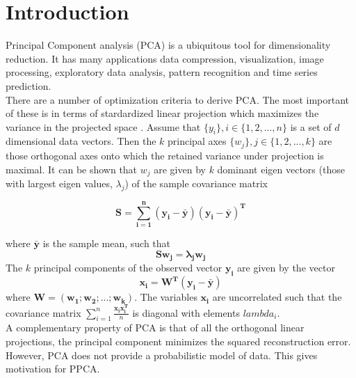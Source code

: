 \chapter{Introduction}

Principal Component analysis (PCA) is a ubiquitous tool for dimensionality reduction.  It has many applications data compression, visualization, image processing, exploratory data analysis, pattern recognition and time series prediction. \\
There are a number of optimization criteria to derive PCA. The most important of these is in terms of stardardized linear projection which maximizes the variance in the projected space \cite{PCA}. Assume that $\{y_i\}, i \in \{1, 2, ..., n\}$ is a set of $d$ dimensional data vectors. Then the $k$ principal axes $\{w_j\}, j \in \{1, 2, ..., k\}$ are those orthogonal axes onto which the retained variance under projection is maximal. It can be shown that $w_j$ are given by $k$ dominant eigen vectors (those with largest eigen values, $\lambda_j$) of the sample covariance matrix  
\begin{center}
\begin{equation}
	\mathbf{S = \sum_{i=1}^n (y_i - \bar{y})(y_i - \bar{y})^T}
\end{equation}
\end{center}
where $\mathbf{\bar{y}}$ is the sample mean, such that
\begin{equation}
\mathbf{Sw_j=\lambda_jw_j}
\end{equation}
The $k$ principal components of the observed vector $\mathbf{y_i}$ are given by the vector 
\begin{equation}
\mathbf{x_i=W^T(y_i - \bar{y})}
\end{equation}
where $\mathbf{W = (w_1;w_2;...;w_k)}$. The variables $\mathbf{x_i}$ are uncorrelated such that the covariance matrix $\sum_{i=1}^n\frac{\mathbf{x_ix_i^T}}{n}$ is diagonal with elements $lambda_i$.\\
A complementary property of PCA is that of all the orthogonal linear projections, the principal component minimizes the squared reconstruction error. However, PCA does not provide a probabilistic model of data. This gives motivation for PPCA.

